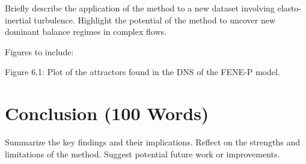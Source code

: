 \documentclass[12pt]{report} %
\begin{document}
Briefly describe the application of the method to a new dataset involving elasto-inertial turbulence.
Highlight the potential of the method to uncover new dominant balance regimes in complex flows.

Figures to include:

Figure 6.1: Plot of the attractors found in the DNS of the FENE-P model.

\section{Conclusion (100 Words)}

Summarize the key findings and their implications.
Reflect on the strengths and limitations of the method.
Suggest potential future work or improvements.





\end{document}
